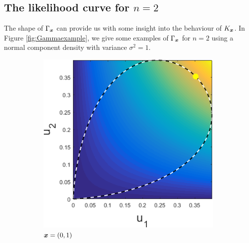	\subsection{The likelihood curve for \texorpdfstring{$n = 2$}{n = 2}}
		The shape of $\Gamma_{\bm{{x}}}$ can provide us with some insight into the behaviour of $K_{\bm{{x}}}$. In Figure \ref{fig:Gammaexample}, we give some examples of $\Gamma_{\bm{{x}}}$ for $n=2$ using a normal component density with variance $\sigma^2 = 1$. 
		\begin{figure}[ht]
			\begin{subfigure}[t]{0.32\textwidth}
				\centering
				\includegraphics[width = \textwidth]{Sigma1x1_0-x2_1}
				\caption{${\bm{{x}}} = (0,1)$} \label{subfig:gammaexamplea}
			\end{subfigure}
			\begin{subfigure}[t]{0.32\textwidth}
				\centering

\end{subfigure}
\end{figure}
